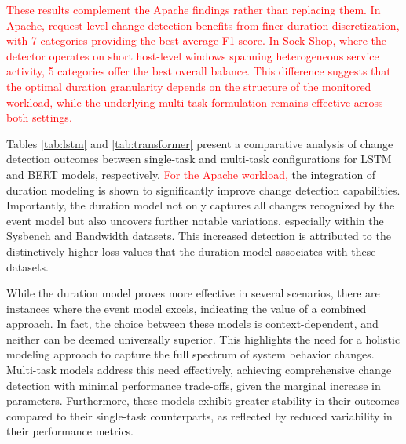 \documentclass[preprint,12pt]{elsarticle}
\begin{document}
\textcolor{red}{These results complement the Apache findings rather than replacing them. In Apache, request-level change detection benefits from finer duration discretization, with 7 categories providing the best average F1-score. In Sock Shop, where the detector operates on short host-level windows spanning heterogeneous service activity, 5 categories offer the best overall balance. This difference suggests that the optimal duration granularity depends on the structure of the monitored workload, while the underlying multi-task formulation remains effective across both settings.}

Tables \ref{tab:lstm} and \ref{tab:transformer} present a comparative analysis of change detection outcomes between single-task and multi-task configurations for LSTM and BERT models, respectively. \textcolor{red}{For the Apache workload,} the integration of duration modeling is shown to significantly improve change detection capabilities. Importantly, the duration model not only captures all changes recognized by the event model but also uncovers further notable variations, especially within the Sysbench and Bandwidth datasets. This increased detection is attributed to the distinctively higher loss values that the duration model associates with these datasets.

While the duration model proves more effective in several scenarios, there are instances where the event model excels, indicating the value of a combined approach. In fact, the choice between these models is context-dependent, and neither can be deemed universally superior.  This highlights the need for a holistic modeling approach to capture the full spectrum of system behavior changes. Multi-task models address this need effectively, achieving comprehensive change detection with minimal performance trade-offs, given the marginal increase in parameters. Furthermore, these models exhibit greater stability in their outcomes compared to their single-task counterparts, as reflected by reduced variability in their performance metrics.
\end{document}
